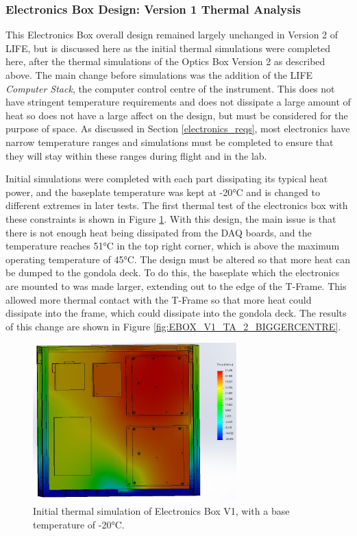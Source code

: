 \subsubsection{Electronics Box Design: Version 1 Thermal Analysis}
This Electronics Box overall design remained largely unchanged in Version 2 of LIFE, but is discussed here as the initial thermal simulations were completed here, after the thermal simulations of the Optics Box Version 2 as described above. The main change before simulations was the addition of the LIFE \textit{Computer Stack}, the computer control centre of the instrument. This does not have stringent temperature requirements and does not dissipate a large amount of heat so does not have a large affect on the design, but must be considered for the purpose of space. As discussed in Section \ref{electronics_reqs}, most electronics have narrow temperature ranges and simulations must be completed to ensure that they will stay within these ranges during flight and in the lab.

Initial simulations were completed with each part dissipating its typical heat power, and the baseplate temperature was kept at -20°C and is changed to different extremes in later tests. The first thermal test of the electronics box with these constraints is shown in Figure \ref{fig:EBOX_V1_TA_1_SQUARECENTRE}. With this design, the main issue is that there is not enough heat being dissipated from the DAQ boards, and the temperature reaches 51°C in the top right corner, which is above the maximum operating temperature of 45°C. The design must be altered so that more heat can be dumped to the gondola deck. To do this, the baseplate which the electronics are mounted to was made larger, extending out to the edge of the T-Frame. This allowed more thermal contact with the T-Frame so that more heat could dissipate into the frame, which could dissipate into the gondola deck. The results of this change are shown in Figure \ref{fig:EBOX_V1_TA_2_BIGGERCENTRE}.

\begin{figure}
    \centering
    \includegraphics[width=0.7\textwidth]{chap3_images/LIFE_V2_images/TA_-20_square_centre_plate.JPG}
    \caption{Initial thermal simulation of Electronics Box V1, with a base temperature of -20°C.}
    \label{fig:EBOX_V1_TA_1_SQUARECENTRE}
\end{figure}

